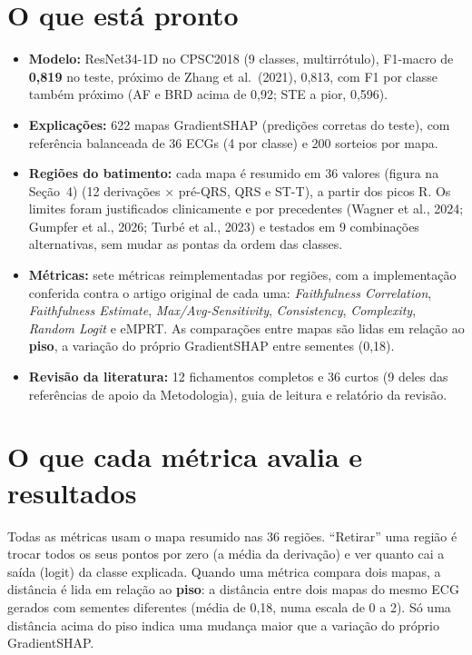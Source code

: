 \documentclass[11pt,a4paper]{article}
\newcommand{\Mx}[1]{\textit{#1}}
\begin{document}
\section{O que está pronto}
\begin{itemize}
\item \textbf{Modelo:} ResNet34-1D no CPSC2018 (9 classes, multirrótulo), F1-macro de \textbf{0,819} no teste, próximo de Zhang et al.\ (2021), 0,813, com F1 por classe também próximo (AF e BRD acima de 0,92; STE a pior, 0,596).
\item \textbf{Explicações:} 622 mapas GradientSHAP (predições corretas do teste), com referência balanceada de 36 ECGs (4 por classe) e 200 sorteios por mapa.
\item \textbf{Regiões do batimento:} cada mapa é resumido em 36 valores (figura na Seção~4) (12 derivações × pré-QRS, QRS e ST-T), a partir dos picos R. Os limites foram justificados clinicamente e por precedentes (Wagner et al., 2024; Gumpfer et al., 2026; Turbé et al., 2023) e testados em 9 combinações alternativas, sem mudar as pontas da ordem das classes.
\item \textbf{Métricas:} sete métricas reimplementadas por regiões, com a implementação conferida contra o artigo original de cada uma: \Mx{Faithfulness Correlation}, \Mx{Faithfulness Estimate}, \Mx{Max/Avg-Sensitivity}, \Mx{Consistency}, \Mx{Complexity}, \Mx{Random Logit} e eMPRT. As comparações entre mapas são lidas em relação ao \textbf{piso}, a variação do próprio GradientSHAP entre sementes (0,18).
\item \textbf{Revisão da literatura:} 12 fichamentos completos e 36 curtos (9 deles das referências de apoio da Metodologia), guia de leitura e relatório da revisão.
\end{itemize}

\section{O que cada métrica avalia e resultados}
Todas as métricas usam o mapa resumido nas 36 regiões. ``Retirar'' uma região é trocar todos os seus pontos por zero (a média da derivação) e ver quanto cai a saída (logit) da classe explicada. Quando uma métrica compara dois mapas, a distância é lida em relação ao \textbf{piso}: a distância entre dois mapas do mesmo ECG gerados com sementes diferentes (média de 0,18, numa escala de 0 a 2). Só uma distância acima do piso indica uma mudança maior que a variação do próprio GradientSHAP.
\end{document}
